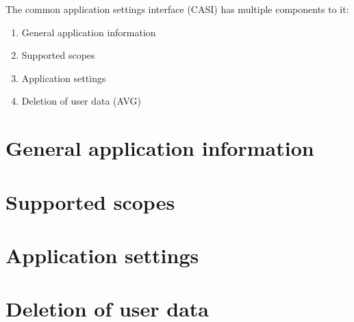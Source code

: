 \documentclass{article}
\begin{document}
    The common application settings interface (CASI) has multiple components to it:
    \begin{enumerate}
        \item General application information
        \item Supported scopes
        \item Application settings
        \item Deletion of user data (AVG)
    \end{enumerate}

    \section{General application information}
    \label{sec:general-application-information}
    

    \section{Supported scopes}
    \label{sec:supported-scopes}
    

    \section{Application settings}
    \label{sec:application-settings}
    

    \section{Deletion of user data}
    \label{sec:deletion-of-user-data}
    
\end{document}
